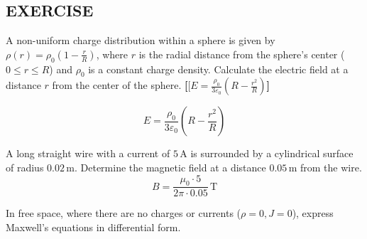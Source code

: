 \begin{mdframed}[backgroundcolor=lightblue, linewidth=1pt, hidealllines=true]
\section{EXERCISE}

\begin{ExerciseList}
\Exercise[label={ex1}] A non-uniform charge distribution within a sphere is given by $\rho(r) = \rho_0 \left(1 - \frac{r}{R}\right)$, where $r$ is the radial distance from the sphere's center ($0 \leq r \leq R$) and $\rho_0$ is a constant charge density. Calculate the electric field at a distance $r$ from the center of the sphere.
\hfill\textbf{[$[E = \frac{\rho_0}{3\varepsilon_0}\left(R - \frac{r^2}{R}\right)$]}



%
%
%
%
%
\Answer[ref={ex1}]
\[E = \frac{\rho_0}{3\varepsilon_0}\left(R - \frac{r^2}{R}\right)\]

\Exercise[label={ex2}] A long straight wire with a current of $5 \, \text{A}$ is surrounded by a cylindrical surface of radius $0.02 \, \text{m}$. Determine the magnetic field at a distance $0.05 \, \text{m}$ from the wire.
\Answer[ref={ex1}]
\[B = \frac{\mu_0 \cdot 5}{2\pi \cdot 0.05} \, \text{T}\]

\Exercise[label={ex3}] In free space, where there are no charges or currents ($\rho = 0, J = 0$), express Maxwell's equations in differential form.

%


\end{ExerciseList}
\end{mdframed}

